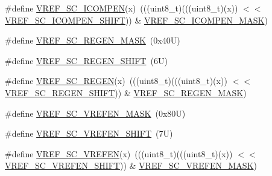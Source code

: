 \begin{DoxyCompactItemize}
\item 
\#define \mbox{\hyperlink{group___v_r_e_f___register___masks_gab383d7f445ab9bf9266da50107d30f7f}{V\+R\+E\+F\+\_\+\+S\+C\+\_\+\+I\+C\+O\+M\+P\+EN}}(x)~(((uint8\+\_\+t)(((uint8\+\_\+t)(x)) $<$$<$ \mbox{\hyperlink{group___v_r_e_f___register___masks_gab4b6bb1062b8e67c9224814d85df2a2c}{V\+R\+E\+F\+\_\+\+S\+C\+\_\+\+I\+C\+O\+M\+P\+E\+N\+\_\+\+S\+H\+I\+FT}})) \& \mbox{\hyperlink{group___v_r_e_f___register___masks_gaeb737c0b08409b6e7ea8de3bf7a90732}{V\+R\+E\+F\+\_\+\+S\+C\+\_\+\+I\+C\+O\+M\+P\+E\+N\+\_\+\+M\+A\+SK}})
\item 
\#define \mbox{\hyperlink{group___v_r_e_f___register___masks_ga1396c56eb73d89394a57b1f83f20c9ea}{V\+R\+E\+F\+\_\+\+S\+C\+\_\+\+R\+E\+G\+E\+N\+\_\+\+M\+A\+SK}}~(0x40\+U)
\item 
\#define \mbox{\hyperlink{group___v_r_e_f___register___masks_gacfe64ba6f4a76a4aef274f2fedb95a90}{V\+R\+E\+F\+\_\+\+S\+C\+\_\+\+R\+E\+G\+E\+N\+\_\+\+S\+H\+I\+FT}}~(6\+U)
\item 
\#define \mbox{\hyperlink{group___v_r_e_f___register___masks_gac93682ccff6c6c12d1929940d197020a}{V\+R\+E\+F\+\_\+\+S\+C\+\_\+\+R\+E\+G\+EN}}(x)~(((uint8\+\_\+t)(((uint8\+\_\+t)(x)) $<$$<$ \mbox{\hyperlink{group___v_r_e_f___register___masks_gacfe64ba6f4a76a4aef274f2fedb95a90}{V\+R\+E\+F\+\_\+\+S\+C\+\_\+\+R\+E\+G\+E\+N\+\_\+\+S\+H\+I\+FT}})) \& \mbox{\hyperlink{group___v_r_e_f___register___masks_ga1396c56eb73d89394a57b1f83f20c9ea}{V\+R\+E\+F\+\_\+\+S\+C\+\_\+\+R\+E\+G\+E\+N\+\_\+\+M\+A\+SK}})
\item 
\#define \mbox{\hyperlink{group___v_r_e_f___register___masks_ga2df8186aa60a77e25e67589bc50ce539}{V\+R\+E\+F\+\_\+\+S\+C\+\_\+\+V\+R\+E\+F\+E\+N\+\_\+\+M\+A\+SK}}~(0x80\+U)
\item 
\#define \mbox{\hyperlink{group___v_r_e_f___register___masks_gaca5e397ea8b43f55854f4a6b80ec479b}{V\+R\+E\+F\+\_\+\+S\+C\+\_\+\+V\+R\+E\+F\+E\+N\+\_\+\+S\+H\+I\+FT}}~(7\+U)
\item 
\#define \mbox{\hyperlink{group___v_r_e_f___register___masks_ga7a5994dbf9e379f63aea014ab33e4822}{V\+R\+E\+F\+\_\+\+S\+C\+\_\+\+V\+R\+E\+F\+EN}}(x)~(((uint8\+\_\+t)(((uint8\+\_\+t)(x)) $<$$<$ \mbox{\hyperlink{group___v_r_e_f___register___masks_gaca5e397ea8b43f55854f4a6b80ec479b}{V\+R\+E\+F\+\_\+\+S\+C\+\_\+\+V\+R\+E\+F\+E\+N\+\_\+\+S\+H\+I\+FT}})) \& \mbox{\hyperlink{group___v_r_e_f___register___masks_ga2df8186aa60a77e25e67589bc50ce539}{V\+R\+E\+F\+\_\+\+S\+C\+\_\+\+V\+R\+E\+F\+E\+N\+\_\+\+M\+A\+SK}})
\end{DoxyCompactItemize}


